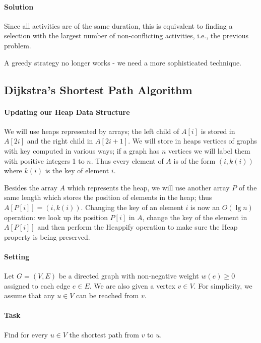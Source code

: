\paragraph{Solution} Since all activities are of the same duration, this is equivalent to finding
a selection with the largest number of non-conflicting activities, i.e., the previous problem.

A greedy strategy no longer works - we need a more sophisticated technique.

\subsection{Dijkstra's Shortest Path Algorithm}

\paragraph{Updating our Heap Data Structure}
We will use heaps represented by arrays; the left child of \(A[i]\) is stored in \(A[2i]\)
and the right child in \(A[2i + 1]\). We will store in heaps vertices of graphs with key 
computed in various ways; if a graph has \(n\) vertices we will label them with positive 
integers 1 to \(n\). Thus every element of \(A\) is of the form \((i, k(i))\) where \(k(i)\)
is the key of element \(i\).

Besides the array \(A\) which represents the heap, we will use another array \(P\) of the 
same length which stores the position of elements in the heap; thus \(A[P[i]]=(i,k(i))\).
Changing the key of an element \(i\) is now an \(O(\lg n)\) operation: we look up its 
position \(P[i]\) in \(A\), change the key of the element in \(A[P[i]]\) and then perform
the Heappify operation to make sure the Heap property is being preserved. 

\paragraph{Setting} Let \(G=(V,E)\) be a directed graph with non-negative weight \(w(e) \geq 0\)
assigned to each edge \(e \in E\). We are also given a vertex \(v \in V\). For simplicity, we
assume that any \(u \in V\) can be reached from \(v\).

\paragraph{Task} Find for every \(u \in V\) the shortest path from \(v\) to \(u\).

